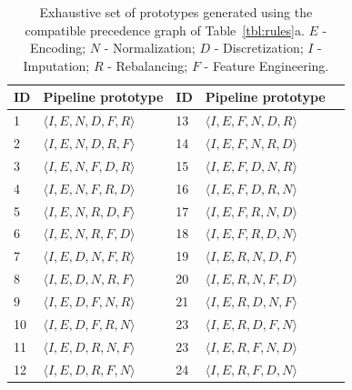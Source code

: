 \begin{table}[t]
\caption[Enumeration of the prototypes that can be generated by compatible precedence]{Exhaustive set of prototypes generated using the compatible precedence graph of Table~\ref{tbl:rules}a. $E$ - Encoding; $N$ - Normalization; $D$ - Discretization; $I$ - Imputation; $R$ - Rebalancing; $F$ - Feature Engineering.
}
\footnotesize
\label{tbl:pipeline-enumeration}
\begin{center}
\begin{tabular}{@{}lllll@{}}
\toprule
ID & Pipeline prototype & ID & Pipeline prototype                                                                   \\ \toprule
1  & {\color[HTML]{000000} $\langle I, E, N, D, F, R \rangle$} & 13 & {\color[HTML]{000000} $\langle I, E, F, N, D, R \rangle$} \\
2  & {\color[HTML]{000000} $\langle I, E, N, D, R, F \rangle$} & 14 & {\color[HTML]{000000} $\langle I, E, F, N, R, D \rangle$} \\
3  & {\color[HTML]{000000} $\langle I, E, N, F, D, R \rangle$} & 15 & {\color[HTML]{000000} $\langle I, E, F, D, N, R \rangle$} \\
4  & {\color[HTML]{000000} $\langle I, E, N, F, R, D \rangle$} & 16 & {\color[HTML]{000000} $\langle I, E, F, D, R, N \rangle$} \\
5  & {\color[HTML]{000000} $\langle I, E, N, R, D, F \rangle$} & 17 & {\color[HTML]{000000} $\langle I, E, F, R, N, D \rangle$} \\
6  & {\color[HTML]{000000} $\langle I, E, N, R, F, D \rangle$} & 18 & {\color[HTML]{000000} $\langle I, E, F, R, D, N \rangle$} \\
7  & {\color[HTML]{000000} $\langle I, E, D, N, F, R \rangle$} & 19 & {\color[HTML]{000000} $\langle I, E, R, N, D, F \rangle$} \\
8  & {\color[HTML]{000000} $\langle I, E, D, N, R, F \rangle$} & 20 & {\color[HTML]{000000} $\langle I, E, R, N, F, D \rangle$} \\
9  & {\color[HTML]{000000} $\langle I, E, D, F, N, R \rangle$} & 21 & {\color[HTML]{000000} $\langle I, E, R, D, N, F \rangle$} \\
10 & {\color[HTML]{000000} $\langle I, E, D, F, R, N \rangle$} & 23 & {\color[HTML]{000000} $\langle I, E, R, D, F, N \rangle$} \\
11 & {\color[HTML]{000000} $\langle I, E, D, R, N, F \rangle$} & 23 & {\color[HTML]{000000} $\langle I, E, R, F, N, D \rangle$} \\
12 & {\color[HTML]{000000} $\langle I, E, D, R, F, N \rangle$} & 24 & {\color[HTML]{000000} $\langle I, E, R, F, D, N \rangle$}
\\ \bottomrule
\end{tabular}
\end{center}
\end{table}

